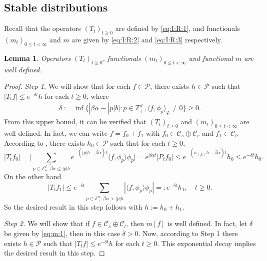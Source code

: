 \documentclass[12pt,a4paper]{amsart}
\theoremstyle{plain}
\newtheorem{lem}[thm]{Lemma}
\theoremstyle{definition}
\numberwithin{equation}{section}
\begin{document}
\subsection{Stable distributions}
\label{sec: stable distributions}
Recall that the operators $(T_t)_{t\geq 0}$ are defined by \eqref{eq:I:R:1},
 and functionals $(m_{t})_{0\leq t< \infty}$ and $m$ are given by \eqref{eq:I:R:2} and \eqref{eq:I:R:3} respectively.
\begin{lem}
  \label{lem:m}
      Operators $(T_t)_{t\geq 0}$, functionals $(m_{t})_{0\leq t< \infty}$ and functional $m$ are well defined.
\end{lem}
\begin{proof}
  \emph{Step 1.} We will show that for each $f \in \mathcal P$,
   there exists  $h \in \mathcal P$ such that
\(
|T_tf|
      \leq  e^{- \delta t} h
\)
for each $t\geq 0$,
where
    \begin{align}
      \label{eq:m:1}
      \delta
      := \inf \big\{ |\tilde \beta \alpha - |p|b| : p \in \mathbb Z_+^d, \langle f, \phi_p\rangle_\varphi \neq 0 \big\}
      \geq 0.
    \end{align}
    From this upper bound, it can be verified that $(T_t)_{t\geq 0}$ and $(m_{t})_{0 \leq t < \infty}$ are well defined.
    In fact, we can write $f = f_0 + f_1$ with $f_0\in \mathcal C_s \oplus \mathcal C_c$ and $f_1 \in \mathcal C_l$.
    According to \cite[Lemma 2.7]{MarksMilos2018CLT},
     there exists $h_0 \in \mathcal P$ such that for each $t\geq 0$,
    \[
      |T_t f_0|
      = \Big| \sum_{p \in  \mathbb Z_+^d: \tilde \beta \alpha \leq |p|b } e^{- ( |p| b - \tilde \beta \alpha ) t} \langle f, \phi_p \rangle \phi_p \Big|
      = e^{\tilde \beta \alpha t} | P_t f_0 |
      \leq e^{- ( \kappa_{(f_0)} b - \tilde \beta \alpha) t} h_0
      \leq e^{- \delta t} h_0.
    \]
  On the other hand
  \[
      |T_t f_1|
    \leq e^{- \delta t}\sum_{p \in \mathbb Z_+^d : \tilde \beta \alpha > |p|b}
    |\langle f, \phi_p \rangle \phi_p|
    =: e^{- \delta t} h_1,
    \quad t\geq 0.
  \]
  So the desired result in this step follows with $h := h_0 + h_1$.

  \emph{Step 2.} We will show that if $f \in \mathcal C_s \oplus \mathcal C_l$, then $m[f]$ is well defined.
  In fact, let $\delta$ be given by \eqref{eq:m:1}, then in this case $\delta > 0$.
  Now, according to Step 1 there exists
    $h \in \mathcal P$ such that
  $|T_tf| \leq e^{- \delta t} h$ for each $t\geq 0$.
  This exponential decay implies the desired result in this step.


\end{proof}
\end{document}
